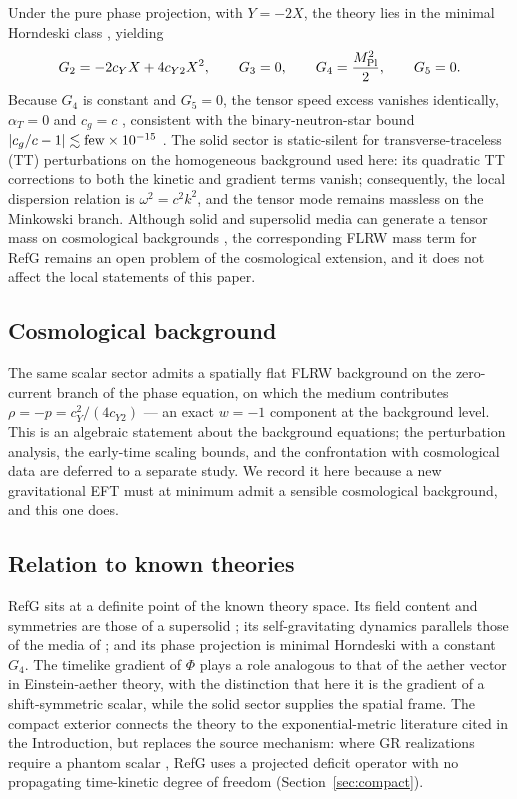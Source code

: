 \documentclass[12pt,a4paper]{article}
\begin{document}
Under the pure phase projection, with $Y=-2X$, the theory lies in the minimal
Horndeski class \cite{Horndeski1974}, yielding
\[
G_2=-2c_YX+4c_{Y2}X^2,\qquad G_3=0,\qquad
G_4=\frac{M_{\rm Pl}^2}{2},\qquad G_5=0 .
\]
Because $G_4$ is constant and $G_5=0$, the tensor speed excess vanishes
identically, $\alpha_T=0$ and $c_g=c$
\cite{Creminelli2017}, consistent with the binary-neutron-star bound
$|c_g/c-1|\lesssim{\rm few}\times10^{-15}$
\cite{Abbott2017GW,Abbott2017GRB}. The solid sector is static-silent for
transverse-traceless (TT) perturbations on the homogeneous background used
here: its quadratic TT corrections to both the kinetic and gradient terms
vanish; consequently, the local dispersion relation is $\omega^2=c^2k^2$, and
the tensor mode remains massless on the Minkowski branch. Although solid and
supersolid media can generate a tensor mass on cosmological backgrounds
\cite{CeloriaComelliPilo2017}, the corresponding FLRW mass term for RefG
remains an open problem of the cosmological extension, and it does not affect
the local statements of this paper.

\subsection{Cosmological background}
\label{sec:cosmo}

The same scalar sector admits a spatially flat FLRW background on the
zero-current branch of the phase equation, on which the medium contributes
$\rho=-p=c_Y^2/(4c_{Y2})$ --- an exact $w=-1$ component at the background
level. This is an algebraic statement about the background equations; the
perturbation analysis, the early-time scaling bounds, and the confrontation
with cosmological data are deferred to a separate study. We record it here
because
a new gravitational EFT must at minimum admit a sensible cosmological
background, and this one does.

\subsection{Relation to known theories}
\label{sec:relation}

RefG sits at a definite point of the known theory space. Its field content
and symmetries are those of a supersolid \cite{NicolisEtAl2015}; its
self-gravitating dynamics parallels those of the media of
\cite{CeloriaComelliPilo2017}; and its phase projection is minimal Horndeski
with a constant $G_4$. The timelike gradient of $\Phi$ plays a role analogous
to that of the aether vector in Einstein-aether theory, with the distinction
that here it is the gradient of a shift-symmetric scalar, while the solid
sector supplies the spatial frame. The compact exterior connects the theory
to the exponential-metric literature cited in the Introduction, but replaces
the source mechanism: where GR realizations require a phantom scalar
\cite{Boonserm2018}, RefG uses a projected deficit operator with no
propagating time-kinetic degree of freedom (Section~\ref{sec:compact}).
\end{document}
